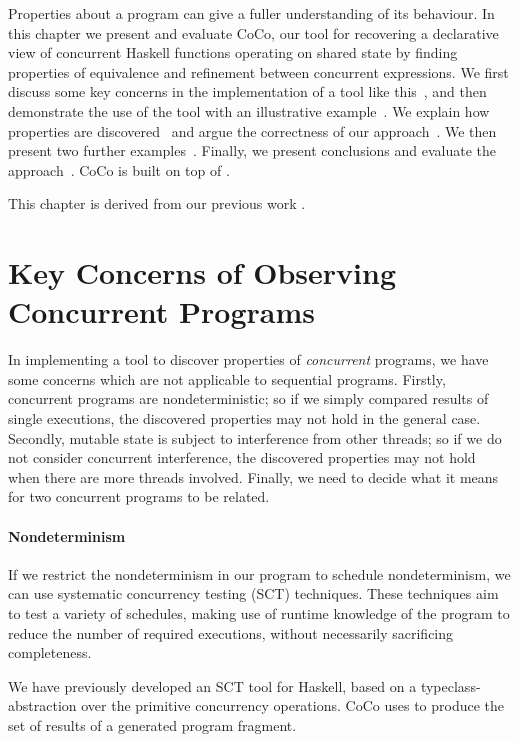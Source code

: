 Properties about a program can give a fuller understanding of its
behaviour.  In this chapter we present and evaluate CoCo, our tool for
recovering a declarative view of concurrent Haskell functions
operating on shared state by finding properties of equivalence and
refinement between concurrent expressions.  We first discuss some key
concerns in the implementation of a tool like
this~, and then demonstrate the use of the tool
with an illustrative example~.  We explain how
properties are discovered~ and argue the correctness of
our approach~.  We then present two further
examples~.  Finally, we present conclusions and
evaluate the approach~.  CoCo is built on top
of \dejafu{}.

This chapter is derived from our previous work .

\section{Key Concerns of Observing Concurrent Programs}
\label{sec:coco-concerns}

In implementing a tool to discover properties of \emph{concurrent}
programs, we have some concerns which are not applicable to sequential
programs.  Firstly, concurrent programs are nondeterministic; so if we
simply compared results of single executions, the discovered
properties may not hold in the general case.  Secondly, mutable state
is subject to interference from other threads; so if we do not
consider concurrent interference, the discovered properties may not
hold when there are more threads involved.  Finally, we need to decide
what it means for two concurrent programs to be related.

\paragraph{Nondeterminism}
If we restrict the nondeterminism in our program to schedule
nondeterminism, we can use systematic concurrency testing
(SCT)\cite{coons2013,flanagan2005,musuvathi2007,musuvathi2008}
techniques.  These techniques aim to test a variety of schedules,
making use of runtime knowledge of the program to reduce the number of
required executions, without necessarily sacrificing completeness.

We have previously developed \dejafu{}\cite{walker2015} an SCT tool
for Haskell, based on a typeclass-abstraction over the primitive
concurrency operations.  CoCo uses \dejafu{} to produce the set of
results of a generated program fragment.

